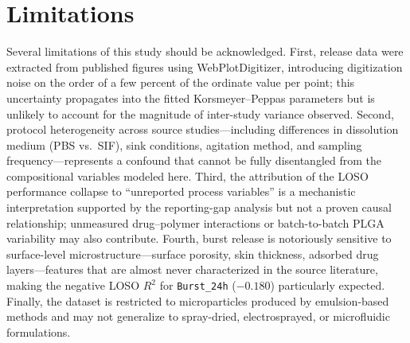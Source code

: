 \FloatBarrier

\section{Limitations}
\label{sec:limitations}

Several limitations of this study should be acknowledged. First, release data were extracted from published figures using WebPlotDigitizer, introducing digitization noise on the order of a few percent of the ordinate value per point; this uncertainty propagates into the fitted Korsmeyer--Peppas parameters but is unlikely to account for the magnitude of inter-study variance observed. Second, protocol heterogeneity across source studies---including differences in dissolution medium (PBS vs.\ SIF), sink conditions, agitation method, and sampling frequency---represents a confound that cannot be fully disentangled from the compositional variables modeled here. Third, the attribution of the LOSO performance collapse to ``unreported process variables'' is a mechanistic interpretation supported by the reporting-gap analysis but not a proven causal relationship; unmeasured drug--polymer interactions or batch-to-batch PLGA variability may also contribute. Fourth, burst release is notoriously sensitive to surface-level microstructure---surface porosity, skin thickness, adsorbed drug layers---features that are almost never characterized in the source literature, making the negative LOSO $R^2$ for \texttt{Burst\_24h} ($-0.180$) particularly expected. Finally, the dataset is restricted to microparticles produced by emulsion-based methods and may not generalize to spray-dried, electrosprayed, or microfluidic formulations.
